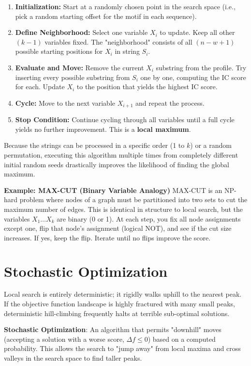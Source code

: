 \begin{enumerate}
  \item \textbf{Initialization:} Start at a randomly chosen point in the search space (i.e., pick a random starting offset for the motif in each sequence).
  \item \textbf{Define Neighborhood:} Select one variable $X_i$ to update. Keep all other $(k-1)$ variables fixed. The "neighborhood" consists of all $(n-w+1)$ possible starting positions for $X_i$ in string $S_i$.
  \item \textbf{Evaluate and Move:} Remove the current $X_i$ substring from the profile. Try inserting every possible substring from $S_i$ one by one, computing the IC score for each. Update $X_i$ to the position that yields the highest IC score.
  \item \textbf{Cycle:} Move to the next variable $X_{i+1}$ and repeat the process. 
  \item \textbf{Stop Condition:} Continue cycling through all variables until a full cycle yields no further improvement. This is a \textbf{local maximum}.
\end{enumerate}

Because the strings can be processed in a specific order (1 to $k$) or a random permutation, executing this algorithm multiple times from completely different initial random seeds drastically improves the likelihood of finding the global maximum. 

\textbf{Example: MAX-CUT (Binary Variable Analogy)}
MAX-CUT is an NP-hard problem where nodes of a graph must be partitioned into two sets to cut the maximum number of edges. This is identical in structure to local search, but the variables $X_1 \dots X_k$ are binary (0 or 1). At each step, you fix all node assignments except one, flip that node's assignment (logical NOT), and see if the cut size increases. If yes, keep the flip. Iterate until no flips improve the score. 

\section{Stochastic Optimization}
Local search is entirely deterministic; it rigidly walks uphill to the nearest peak. If the objective function landscape is highly fractured with many small peaks, deterministic hill-climbing frequently halts at terrible sub-optimal solutions. 

\begin{important}
  \textbf{Stochastic Optimization}: An algorithm that permits "downhill" moves (accepting a solution with a worse score, $\Delta f \leq 0$) based on a computed probability. This allows the search to "jump away" from local maxima and cross valleys in the search space to find taller peaks.
\end{important}

